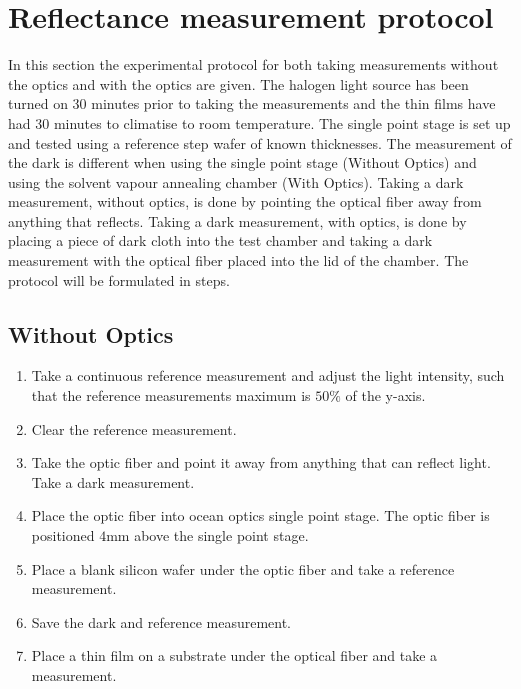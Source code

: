 \documentclass[MasterThesisMain.tex]{subfiles}
\begin{document}
\section{Reflectance measurement protocol}
In this section the experimental protocol for both taking measurements without the optics and with the optics are given. The halogen light source has been turned on 30 minutes prior to taking the measurements and the thin films have had 30 minutes to climatise to room temperature. The single point stage is set up and tested using a reference step wafer of known thicknesses. The measurement of the dark is different when using the single point stage (Without Optics) and using the solvent vapour annealing chamber (With Optics). Taking a dark measurement, without optics, is done by pointing the optical fiber away from anything that reflects. Taking a dark measurement, with optics, is done by placing a piece of dark cloth into the test chamber and taking a dark measurement with the optical fiber placed into the lid of the chamber. The protocol will be formulated in steps.

\subsection{Without Optics}
\begin{enumerate}
\item Take a continuous reference measurement and adjust the light intensity, such that the reference measurements maximum is $50\%$ of the y-axis.
\item Clear the reference measurement.
\item Take the optic fiber and point it away from anything that can reflect light. Take a dark measurement.
\item Place the optic fiber into ocean optics single point stage. The optic fiber is positioned $4$mm above the single point stage.
\item Place a blank silicon wafer under the optic fiber and take a reference measurement.
\item Save the dark and reference measurement.
\item Place a thin film on a substrate under the optical fiber and take a measurement.  
\end{enumerate}
\end{document}
